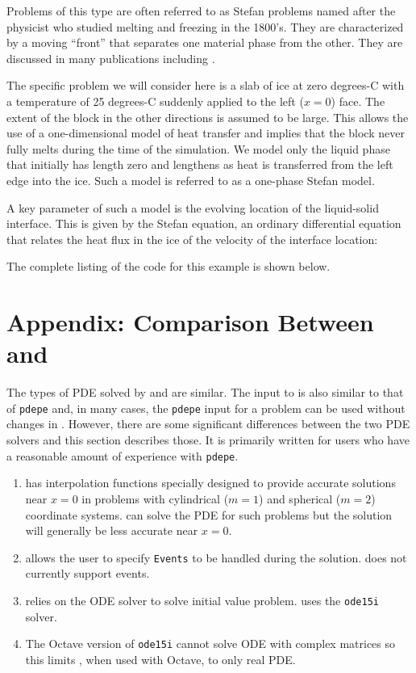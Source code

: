 \documentclass{article}
\begin{document}
Problems of this type are often referred to as Stefan problems named after the physicist
who studied melting and freezing in the 1800's. They are characterized by a moving ``front''
that separates one material phase from the other. They are discussed in many publications
including \cite{meltingFreezing}.

The specific problem we will consider here is a slab of ice at zero degrees-C
with a temperature of 25 degrees-C suddenly applied to the left ($x=0$) face. The
extent of the block in the other directions is assumed to be large. This allows the
use of a one-dimensional model of heat transfer and implies that the block never fully
melts during the time of the simulation. We model only the liquid phase that initially 
has length zero and lengthens as heat is transferred from the left edge into the ice. Such 
a model is referred to as a one-phase Stefan model.

A key parameter of such a model is the evolving location of the liquid-solid interface. 
This is given by the Stefan equation, an ordinary differential equation that relates the
heat flux in the ice of the velocity of the interface location:



The complete listing of the \ml code for this example is shown below.

\newpage
\appendix
\section{Appendix: Comparison Between \pde and \ml \pdepe} \label{sec:pdepe} 
The types of PDE solved by \pde and  are similar. The input to \pde is
also similar to that of {\tt pdepe} and, in many cases, the  {\tt pdepe} input for a
problem can be used without changes in \pde. However, there are some significant differences
between the two PDE solvers and this section describes those. It is primarily written for users
who have a reasonable amount of experience with {\tt pdepe}.

\begin{enumerate}
\item
\pdepe has interpolation functions specially designed to provide accurate solutions near $x=0$
in problems with cylindrical ($m=1$) and spherical ($m=2$) coordinate systems. \pde can solve
the PDE for such problems but the solution will generally be less accurate near $x=0$.
\item
\pdepe allows the user to specify {\tt Events} to be handled during the solution. \pde does not currently support events.
\item
\pdepe relies on the  ODE solver to solve initial value problem. \pde uses the {\tt ode15i} solver.
\item 
The Octave version of {\tt ode15i} cannot solve ODE with complex matrices so this limits
\pde, when used with Octave, to only real PDE.
\end{enumerate}
\end{document}
